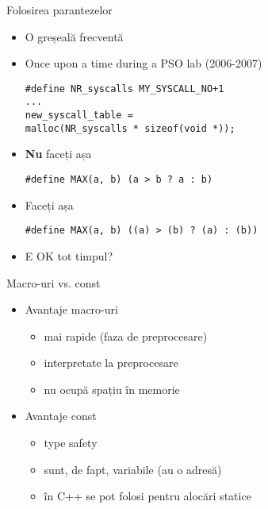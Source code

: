 \documentclass{beamer}
\begin{document}
\begin{frame}{Folosirea parantezelor}
	\begin{itemize}
		\item O greșeală frecventă
		\item Once upon a time during a PSO lab (2006-2007)
			\begin{beamerboxesrounded}[lower=block body,shadow=true]{}
				\texttt{\#define NR\_syscalls     MY\_SYSCALL\_NO+1 \\
			... \\
				new\_syscall\_table = \\
\hlstd{}\hlstd{\ \ \ \ \ \ \ \ }\hlstd{}malloc(NR\_syscalls * sizeof(void *));
		}
			\end{beamerboxesrounded}
		\item \textbf{Nu} faceți așa
			\begin{beamerboxesrounded}[lower=block body,shadow=true]{}
				\texttt{\#define MAX(a, b)   (a > b ? a : b)}
			\end{beamerboxesrounded}
		\item Faceți așa
			\begin{beamerboxesrounded}[lower=block body,shadow=true]{}
				\texttt{\#define MAX(a, b)   ((a) > (b) ? (a) : (b))}
			\end{beamerboxesrounded}
		\item E OK tot timpul?
	\end{itemize}
\end{frame}

\begin{frame}{Macro-uri vs. const}
	\begin{itemize}
		\item Avantaje macro-uri
			\begin{itemize}
				\item mai rapide (faza de preprocesare)
				\item interpretate la preprocesare
				\item nu ocupă spațiu în memorie
			\end{itemize}
		\item Avantaje const
			\begin{itemize}
				\item type safety
				\item sunt, de fapt, variabile (au o adresă)
				\item în C++ se pot folosi pentru alocări statice
			\end{itemize}
	\end{itemize}
\end{frame}
\end{document}
